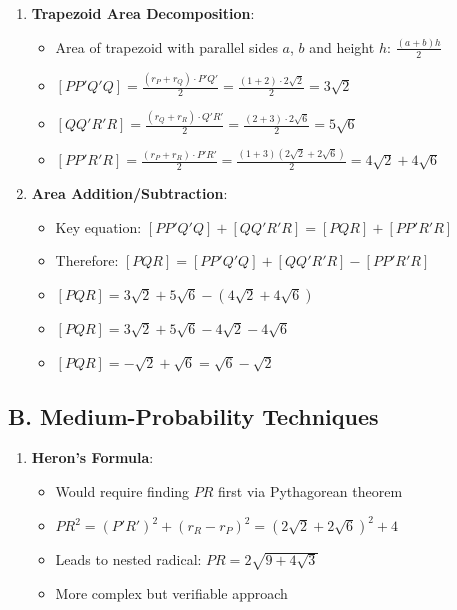 \documentclass[]{article}
\begin{document}
\begin{techniquesbox}
\begin{enumerate}[leftmargin=*]
    \item \textbf{Trapezoid Area Decomposition}:
    \begin{itemize}
        \item Area of trapezoid with parallel sides $a$, $b$ and height $h$: $\frac{(a+b)h}{2}$
        \item $[PP'Q'Q] = \frac{(r_P + r_Q) \cdot P'Q'}{2} = \frac{(1+2) \cdot 2\sqrt{2}}{2} = 3\sqrt{2}$
        \item $[QQ'R'R] = \frac{(r_Q + r_R) \cdot Q'R'}{2} = \frac{(2+3) \cdot 2\sqrt{6}}{2} = 5\sqrt{6}$
        \item $[PP'R'R] = \frac{(r_P + r_R) \cdot P'R'}{2} = \frac{(1+3)(2\sqrt{2}+2\sqrt{6})}{2} = 4\sqrt{2} + 4\sqrt{6}$
    \end{itemize}
    
    \item \textbf{Area Addition/Subtraction}:
    \begin{itemize}
        \item Key equation: $[PP'Q'Q] + [QQ'R'R] = [PQR] + [PP'R'R]$
        \item Therefore: $[PQR] = [PP'Q'Q] + [QQ'R'R] - [PP'R'R]$
        \item $[PQR] = 3\sqrt{2} + 5\sqrt{6} - (4\sqrt{2} + 4\sqrt{6})$
        \item $[PQR] = 3\sqrt{2} + 5\sqrt{6} - 4\sqrt{2} - 4\sqrt{6}$
        \item $[PQR] = -\sqrt{2} + \sqrt{6} = \sqrt{6} - \sqrt{2}$
    \end{itemize}
\end{enumerate}

\subsection*{B. Medium-Probability Techniques}
\begin{enumerate}[leftmargin=*]
    \item \textbf{Heron's Formula}: 
    \begin{itemize}
        \item Would require finding $PR$ first via Pythagorean theorem
        \item $PR^2 = (P'R')^2 + (r_R - r_P)^2 = (2\sqrt{2}+2\sqrt{6})^2 + 4$
        \item Leads to nested radical: $PR = 2\sqrt{9 + 4\sqrt{3}}$
        \item More complex but verifiable approach
    \end{itemize}
\end{enumerate}


\end{techniquesbox}
\end{document}
